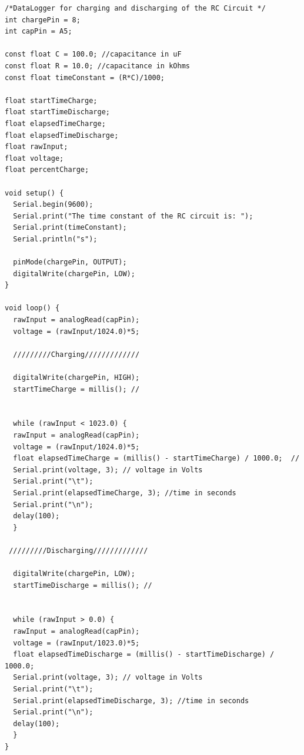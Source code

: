 \begin{lstlisting}[style = Arduino]
/*DataLogger for charging and discharging of the RC Circuit */
int chargePin = 8;
int capPin = A5;

const float C = 100.0; //capacitance in uF
const float R = 10.0; //capacitance in kOhms
const float timeConstant = (R*C)/1000;

float startTimeCharge;
float startTimeDischarge;
float elapsedTimeCharge;
float elapsedTimeDischarge;
float rawInput;
float voltage;
float percentCharge;

void setup() {
  Serial.begin(9600); 
  Serial.print("The time constant of the RC circuit is: ");
  Serial.print(timeConstant);
  Serial.println("s");
  
  pinMode(chargePin, OUTPUT);
  digitalWrite(chargePin, LOW);
}

void loop() {
  rawInput = analogRead(capPin);
  voltage = (rawInput/1024.0)*5; 
  
  /////////Charging/////////////
  
  digitalWrite(chargePin, HIGH); 
  startTimeCharge = millis(); //
    
  
  while (rawInput < 1023.0) {
  rawInput = analogRead(capPin);
  voltage = (rawInput/1024.0)*5;
  float elapsedTimeCharge = (millis() - startTimeCharge) / 1000.0;  //  
  Serial.print(voltage, 3); // voltage in Volts 
  Serial.print("\t");
  Serial.print(elapsedTimeCharge, 3); //time in seconds 
  Serial.print("\n");
  delay(100);   
  }
  
 /////////Discharging/////////////
  
  digitalWrite(chargePin, LOW); 
  startTimeDischarge = millis(); //
  
  
  while (rawInput > 0.0) {   
  rawInput = analogRead(capPin);
  voltage = (rawInput/1023.0)*5;
  float elapsedTimeDischarge = (millis() - startTimeDischarge) / 1000.0;    
  Serial.print(voltage, 3); // voltage in Volts 
  Serial.print("\t");
  Serial.print(elapsedTimeDischarge, 3); //time in seconds 
  Serial.print("\n");
  delay(100);   
  }
}
\end{lstlisting}

